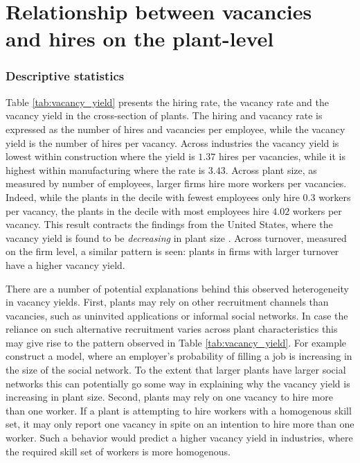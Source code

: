 \section{Relationship between vacancies and hires on the plant-level}
\label{sec:basic_rel}

\subsubsection{Descriptive statistics}



Table \ref{tab:vacancy_yield} presents the hiring rate, the vacancy rate and the vacancy yield in the cross-section of plants. The hiring and vacancy rate is expressed as the number of hires and vacancies per employee, while the vacancy yield is the number of hires per vacancy. Across industries the vacancy yield is lowest within construction where the yield is $1.37$ hires per vacancies, while it is highest within manufacturing where the rate is $3.43$. Across plant size, as measured by number of employees, larger firms hire more workers per vacancies. Indeed, while the plants in the decile with fewest employees only hire $0.3$ workers per vacancy, the plants in the decile with most employees hire $4.02$ workers per vacancy. This result contracts the findings from the United States, where the vacancy yield is found to be \emph{decreasing} in plant size \citep{Moscarini2016, Davis2013}. Across turnover, measured on the firm level, a similar pattern is seen: plants in firms with larger turnover have a higher vacancy yield.


There are a number of potential explanations behind this observed heterogeneity in vacancy yields. First, plants may rely on other recruitment channels than vacancies, such as uninvited applications or informal social networks. In case the reliance on such alternative recruitment varies across plant characteristics this may give rise to the pattern observed in Table \ref{tab:vacancy_yield}. For example \cite{Cahuc2009} construct a model, where an employer's probability of filling a job is increasing in the size of the social network. To the extent that larger plants have larger social networks this can potentially go some way in explaining why the vacancy yield is increasing in plant size. Second, plants may rely on one vacancy to hire more than one worker. If a plant is attempting to hire workers with a homogenous skill set, it may only report one vacancy in spite on an intention to hire more than one worker. Such a behavior would predict a higher vacancy yield in industries, where the required skill set of workers is more homogenous.

